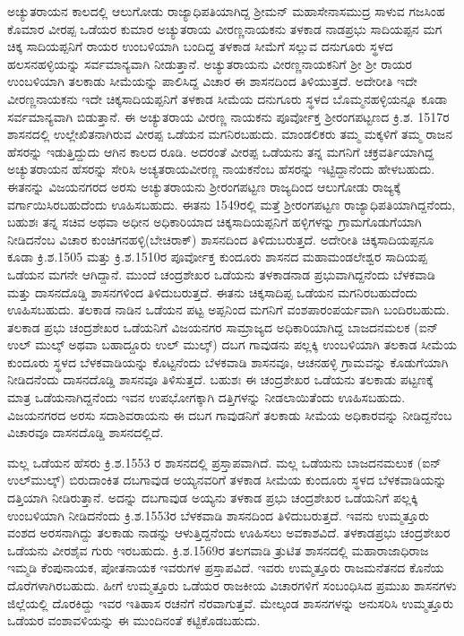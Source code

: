 ಅಚ್ಯುತರಾಯನ ಕಾಲದಲ್ಲಿ ಆಲುಗೋಡು ರಾಜ್ಯಾಧಿಪತಿಯಾಗಿದ್ದ ಶ‍್ರೀಮನ್​ ಮಹಾಸೇನಾಸಮುದ್ರ ಸಾಳುವ ಗಜಸಿಂಹ ಕೊಮಾರ ವೀರಪ್ಪ ಒಡೆಯರ ಕುಮಾರ ಅಚ್ಯುತರಾಯ ವೀರಣ್ಣನಾಯಕನು ತಳಕಾಡ ನಾಡಪ್ರಭು ಸಾದಿಯಪ್ಪನ ಮಗ ಚಿಕ್ಕ ಸಾದಿಯಪ್ಪನಿಗೆ ರಾಯರ ಉಂಬಳಿಯಾಗಿ ಬಂದಿದ್ದ ತಳಕಾಡ ಸೀಮೆಗೆ ಸಲ್ಲುವ ದನುಗೂರು ಸ್ಥಳದ ಹಲಸನಹಳ್ಳಿಯನ್ನು ಸರ್ವಮಾನ್ಯವಾಗಿ ನೀಡುತ್ತಾನೆ. ಅಚ್ಯುತರಾಯನು ವೀರಣ್ಣನಾಯಕನಿಗೆ ಶ‍್ರೀ ಶ‍್ರೀ ರಾಯರ ಉಂಬಳಿಯಾಗಿ ತಲಕಾಡು ಸೀಮೆಯನ್ನು ಪಾಲಿಸಿದ್ದ ವಿಚಾರ ಈ ಶಾಸನದಿಂದ ತಿಳಿಯುತ್ತದೆ. ಅದೇರೀತಿ ಇದೇ ವೀರಣ್ಣನಾಯಕನು ಇದೇ ಚಿಕ್ಕಸಾದಿಯಪ್ಪನಿಗೆ ತಳಕಾಡ ಸೀಮೆಯ ದನುಗೂರು ಸ್ಥಳದ ಬೊಮ್ಮನಹಳ್ಳಿಯನ್ನೂ ಕೂಡಾ ಸರ್ವಮಾನ್ಯವಾಗಿ ಬಿಡುತ್ತಾನೆ. ಈ ಅಚ್ಯುತರಾಯ ವೀರಣ್ಣ ನಾಯಕನು ಪೂರ್ವೋಕ್ತ ಶ‍್ರೀರಂಗಪಟ್ಟಣದ ಕ್ರಿ.ಶ. 1517ರ ಶಾಸನದಲ್ಲಿ ಉಲ್ಲೇಖಿತನಾಗಿರುವ ವೀರಪ್ಪ ಒಡೆಯನ ಮಗನಿರಬಹುದು. ಮಾಂಡಲಿಕರು ತಮ್ಮ ಮಕ್ಕಳಿಗೆ ತಮ್ಮ ರಾಜನ ಹೆಸರನ್ನು ಇಡುತ್ತಿದ್ದುದು ಆಗಿನ ಕಾಲದ ರೂಡಿ. ಅದರಂತೆ ವೀರಪ್ಪ ಒಡೆಯನು ತನ್ನ ಮಗನಿಗೆ ಚಕ್ರವರ್ತಿಯಾಗಿದ್ದ ಅಚ್ಯುತರಾಯನ ಹೆಸರನ್ನು ಸೇರಿಸಿ ಅಚ್ಯತರಾಯವೀರಣ್ಣ ನಾಯಕನೆಂಬ ಹೆಸರನ್ನು ಇಟ್ಟಿದ್ದಾನೆಂದು ಹೇಳಬಹುದು. ಈತನನ್ನು ವಿಜಯನಗರದ ಅರಸು ಅಚ್ಯುತರಾಯನು ಶ‍್ರೀರಂಗಪಟ್ಟಣ ರಾಜ್ಯದಿಂದ ಆಲುಗೋಡು ರಾಜ್ಯಕ್ಕೆ ವರ್ಗಾಯಿಸಿರಬಹುದೆಂದು ಊಹಿಸಬಹುದು. ಈತನು 1549ರಲ್ಲಿ ಮತ್ತೆ ಶ‍್ರೀರಂಗಪಟ್ಟಣ ರಾಜ್ಯಾಧಿಪತಿಯಾಗಿದ್ದನೆಂದು, ಬಹುಶಃ ತನ್ನ ಸಚಿವ ಅಥವಾ ಅಧೀನ ಅಧಿಕಾರಿಯಾದ ಚಿಕ್ಕಸಾದಿಯಪ್ಪನಿಗೆ ಹಳ್ಳಿಗಳನ್ನು ಗ್ರಾಮಗೊಡುಗೆಯಾಗಿ ನೀಡಿದನೆಂಬ ವಿಚಾರ ಕುಂಚಿಗನಹಳ್ಳಿ(ಬೇಚಿರಾಕ್​) ಶಾಸನದಿಂದ ತಿಳಿದುಬರುತ್ತದೆ. ಅದೇರೀತಿ ಚಿಕ್ಕಸಾದಿಯಪ್ಪನೂ ಕೂಡಾ ಕ್ರಿ.ಶ.1505 ಮತ್ತು ಕ್ರಿ.ಶ.1510ರ ಪೂರ್ವೋಕ್ತ ಕುಂದೂರು ಶಾಸನದ ಮಹಾಮಂಡಲೇಶ್ವರ ಸಾದಿಯಪ್ಪ ಒಡೆಯನ ಮಗನೇ ಆಗಿದ್ದಾನೆ. ಮುಂದೆ ಚಂದ್ರಶೇಖರ ಒಡೆಯನು ತಳಕಾಡನಾಡ ಪ್ರಭುವಾಗಿದ್ದನೆಂದು ಬೆಳಕವಾಡಿ ಮತ್ತು ದಾಸನದೊಡ್ಡಿ ಶಾಸನಗಳಿಂದ ತಿಳಿದುಬರುತ್ತದೆ. ಈತನು ಚಿಕ್ಕಸಾದಿಪ್ಪ ಒಡೆಯನ ಮಗನಿರಬಹುದೆಂದು ಊಹಿಸಬಹುದು. ತಲಕಾಡ ನಾಡಿನ ಒಡೆಯನ ಪಟ್ಟ ಅಪ್ಪನಿಂದ ಮಗನಿಗೆ ವಂಶಪಾರಂಪರ್ಯವಾಗಿ ಬಂದಿರಬಹುದು. ತಲಕಾಡ ಪ್ರಭು ಚಂದ್ರಶೇಖರ ಒಡೆಯನಿಗೆ ವಿಜಯನಗರ ಸಾಮ್ರಾಜ್ಯದ ಅಧಿಕಾರಿಯಾಗಿದ್ದ ಬಾಜದನಮಲಕ (ಐನ್​ ಉಲ್​ ಮುಲ್ಕ್​ ಅಥವಾ ಬಹಾದ್ದೂರು ಉಲ್​ ಮುಲ್ಕ್​) ದಬಗ ಗಾವುಡನು ಪಲ್ಲಕ್ಕಿ ಉಂಬಳಿಯಾಗಿ ತಲಕಾಡ ಸೀಮೆಯ ಕುಂದೂರು ಸ್ಥಳದ ಬೆಳಕವಾಡಿಯನ್ನು ಕೊಟ್ಟನೆಂದು ಬೆಳಕವಾಡಿ ಶಾಸನವೂ, ಆಚನಹಳ್ಳಿ ಗ್ರಾಮವನ್ನು ಕೊಡುಗೆಯಾಗಿ ನೀಡಿದನೆಂದು ದಾಸನದೊಡ್ಡಿ ಶಾಸನವೂ ತಿಳಿಸುತ್ತದೆ. ಬಹುಶಃ ಈ ಚಂದ್ರಶೇಖರ ಒಡೆಯನು ತಲಕಾಡು ಪಟ್ಟಣಕ್ಕೆ ಮಾತ್ರ ಒಡೆಯನಾಗಿದ್ದನೆಂದು ಇವನ ಉಪಭೋಗಕ್ಕಾಗಿ ದತ್ತಿಗಳನ್ನು ನೀಡಲಾಯಿತೆಂದು ಊಹಿಸಬಹುದು. ವಿಜಯನಗರದ ಅರಸು ಸದಾಶಿವರಾಯನು ಈ ದಬಗ ಗಾವುಡನಿಗೆ ತಲಕಾಡು ಸೀಮೆಯ ಅಧಿಕಾರವನ್ನು ನೀಡಿದ್ದನೆಂಬ ವಿಚಾರವೂ ದಾಸನದೊಡ್ಡಿ ಶಾಸನದಲ್ಲಿದೆ.

ಮಲ್ಲ ಒಡೆಯನ ಹೆಸರು ಕ್ರಿ.ಶ.1553 ರ ಶಾಸನದಲ್ಲಿ ಪ್ರಸ್ತಾಪವಾಗಿದೆ. ಮಲ್ಲ ಒಡೆಯನು ಬಾಜದನಮಲುಕ (ಐನ್​ಉಲ್​ಮುಲ್ಕ್​) ಬಿರುದಾಂಕಿತ ದಬಗಾವುಡ ಅಯ್ಯನವರಿಗೆ ತಳಕಾಡ ಸೀಮೆಯ ಕುಂದೂರು ಸ್ಥಳದ ಬೆಳಕವಾಡಿಯನ್ನು ದತ್ತಿಯಾಗಿ ನೀಡಿರುತ್ತಾನೆ. ಅದನ್ನು ದಬಗಾವುಡ ಅಯ್ಯನು ತಳಕಾಡ ಪ್ರಭು ಚಂದ್ರಶೇಖರ ಒಡೆಯನಿಗೆ ಪಲ್ಲಕ್ಕಿ ಉಂಬಳಿಯಾಗಿ ನೀಡಿದನೆಂದು ಕ್ರಿ.ಶ.1553ರ ಬೆಳಕವಾಡಿ ಶಾಸನದಿಂದ ತಿಳಿದುಬರುತ್ತದೆ. ಇವನು ಉಮ್ಮತ್ತೂರು ವಂಶದ ಅರಸನಾಗಿದ್ದು ತಲಕಾಡು ನಾಡನ್ನು ಆಳುತ್ತಿದ್ದನೆಂದು ಊಹಿಸಲು ಅವಕಾಶವಿದೆ. ತಳಕಾಡಪ್ರಭು ಚಂದ್ರಶೇಖರ ಒಡೆಯನು ವೀರಶೈವ ಗುರು ಇರಬಹುದು. ಕ್ರಿ.ಶ.1569ರ ತಲಗವಾಡಿ ತ್ರುಟಿತ ಶಾಸನದಲ್ಲಿ ಮಹಾರಾಜಾಧಿರಾಜ ಇಮ್ಮಡಿ ಕೆಂಪುನಾಯಕ, ಪೋತನಾಯಕ ಇವರುಗಳ ಪ್ರಸ್ತಾಪವಿದೆ. ಇವರು ಉಮ್ಮತ್ತೂರು ರಾಜಮನೆತನದ ಕೊನೆಯ ದೊರೆಗಳಾಗಿರಬಹುದು. ಹೀಗೆ ಉಮ್ಮತ್ತೂರು ಒಡೆಯರ ರಾಜಕೀಯ ವಿಚಾರಗಳಿಗೆ ಸಂಬಂಧಿಸಿದ ಪ್ರಮುಖ ಶಾಸನಗಳು ಜಿಲ್ಲೆಯಲ್ಲಿ ದೊರಕಿದ್ದು ಇವರ ಇತಿಹಾಸ ರಚನೆಗೆ ನೆರವಾಗುತ್ತವೆ. ಮೇಲ್ಕಂಡ ಶಾಸನಗಳನ್ನು ಅನುಸರಿಸಿ ಉಮ್ಮತ್ತೂರು ಒಡೆಯರ ವಂಶಾವಳಿಯನ್ನು ಈ ಮುಂದಿನಂತೆ ಕಟ್ಟಿಕೊಡಬಹುದು.


